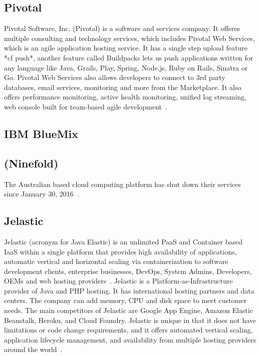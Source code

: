 \pv

\subsection{Pivotal}

Pivotal Software, Inc. (Pivotal) is a software and services
company. It offeres multiple consulting and technology services, which
includes Pivotal Web Services, which is an agile application hosting
service. It has a single step upload feature *cf push*, another
feature called Buildpacks lets us push applications written for any
language like Java, Grails, Play, Spring, Node.js, Ruby on Rails,
Sinatra or Go. Pivotal Web Services also allows developers to connect
to 3rd party databases, email services, monitoring and more from the
Marketplace. It also offers performance monitoring, active health
monitoring, unified log streaming, web console built for team-based
agile development~\cite{pivotal-www}.

\subsection{IBM BlueMix}

\pv

\subsection{ (Ninefold)}

The Australian based cloud computing platform has shut down their
services since January 30, 2016~\cite{www-ninefoldSite}.

    \pv

\subsection{Jelastic}

Jelastic (acronym for Java Elastic) is an unlimited PaaS and Container
based IaaS within a single platform that provides high availability of
applications, automatic vertical and horizontal scaling via
containerization to software development clients, enterprise
businesses, DevOps, System Admins, Developers, OEMs and web hosting
providers~\cite{www-jelastic-2}. Jelastic is a
Platform-as-Infrastructure provider of Java and PHP hosting.  It has
international hosting partners and data centers. The company can add
memory, CPU and disk space to meet customer needs. The main
competitors of Jelastic are Google App Engine, Amazon Elastic
Beanstalk, Heroku, and Cloud Foundry. Jelastic is unique in that it
does not have limitations or code change requirements, and it offers
automated vertical scaling, application lifecycle management, and
availability from multiple hosting providers around the
world~\cite{www-jelastic-1}.

